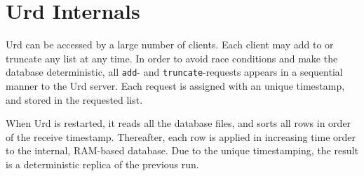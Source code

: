 \section{Urd Internals}
Urd can be accessed by a large number of clients.  Each client may add
to or truncate any list at any time.  In order to avoid race
conditions and make the database deterministic, all \texttt{add}-
and \texttt{truncate}-requests appears in a sequential manner to the
Urd server.  Each request is assigned with an unique timestamp, and
stored in the requested list.

When Urd is restarted, it reads all the database files, and sorts all
rows in order of the receive timestamp.  Thereafter, each row is
applied in increasing time order to the internal, RAM-based database.
Due to the unique timestamping, the result is a deterministic replica
of the previous run.
